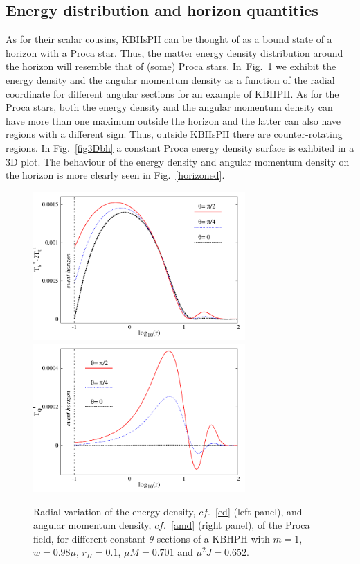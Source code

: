 \subsection{Energy distribution and horizon quantities}
\label{subsec_IV}
As for their scalar cousins, KBHsPH can be thought of as a bound state of a horizon with a Proca star. Thus, the matter energy density distribution around the horizon will resemble that of (some) Proca stars. In~Fig.~\ref{figenergybhs}  we exhibit the energy density and the angular momentum density as a function of the radial coordinate for different angular sections for an example of KBHPH. As for the Proca stars, both the energy density and the angular momentum density can have more than one maximum outside the horizon and the latter can also have regions with a different sign. Thus, outside KBHsPH there are counter-rotating regions. In Fig.~\ref{fig3Dbh} a constant Proca energy density surface is exhbited in a 3D plot. The behaviour of the energy density and angular momentum density on the horizon is more clearly seen in Fig.~\ref{horizoned}.


\begin{figure}[h!]
  \begin{center}
    \includegraphics[width=8.1cm]{papers/Proca/BH-ro-m1.pdf}
      \includegraphics[width=8.1cm]{papers/Proca/BH-T34.pdf}
  \end{center}
  \caption{Radial variation of the energy density, $cf.$~\eqref{ed} (left panel), and angular momentum density, $cf.$~\eqref{amd}  (right panel),  of the Proca field, for different constant $\theta$ sections of a KBHPH with $m=1$, $w=0.98\mu$, $r_H=0.1$,  $\mu M=0.701$ and $\mu^2J=0.652$.}
  \label{figenergybhs}
\end{figure}



